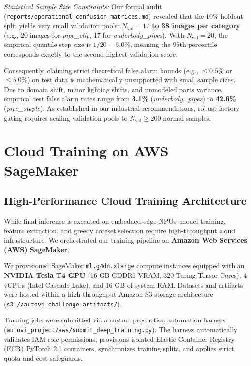 \documentclass[journal,twocolumn]{IEEEtran}
\begin{document}
\textit{Statistical Sample Size Constraints:} Our formal audit (\texttt{reports/operational\_confusion\_matrices.md}) revealed that the 10\% holdout split yields very small validation pools: \textbf{$N_{\text{val}} = 17$ to 38 images per category} (e.g., 20 images for \textit{pipe\_clip}, 17 for \textit{underbody\_pipes}). With $N_{\text{val}} = 20$, the empirical quantile step size is $1 / 20 = 5.0\%$, meaning the 95th percentile corresponds exactly to the second highest validation score.

Consequently, claiming strict theoretical false alarm bounds (e.g., $\le 0.5\%$ or $\le 5.0\%$) on test data is mathematically unsupported with small sample sizes. Due to domain shift, minor lighting shifts, and unmodeled parts variance, empirical test false alarm rates range from \textbf{3.1\%} (\textit{underbody\_pipes}) to \textbf{42.6\%} (\textit{pipe\_staple}). As established in our industrial recommendations, robust factory gating requires scaling validation pools to $N_{\text{val}} \ge 200$ normal samples.

\section{Cloud Training on AWS SageMaker}
\subsection{High-Performance Cloud Training Architecture}
While final inference is executed on embedded edge NPUs, model training, feature extraction, and greedy coreset selection require high-throughput cloud infrastructure. We orchestrated our training pipeline on \textbf{Amazon Web Services (AWS) SageMaker}.

We provisioned SageMaker \texttt{ml.g4dn.xlarge} compute instances equipped with an \textbf{NVIDIA Tesla T4 GPU} (16 GB GDDR6 VRAM, 320 Turing Tensor Cores), 4 vCPUs (Intel Cascade Lake), and 16 GB of system RAM. Datasets and artifacts were hosted within a high-throughput Amazon S3 storage architecture (\texttt{s3://autovi-challenge-artifacts/}).

Training jobs were submitted via a custom production automation harness (\texttt{autovi\_project/aws/submit\_deep\_training.py}). The harness automatically validates IAM role permissions, provisions isolated Elastic Container Registry (ECR) PyTorch 2.1 containers, synchronizes training splits, and applies strict quota and cost safeguards.
\end{document}
